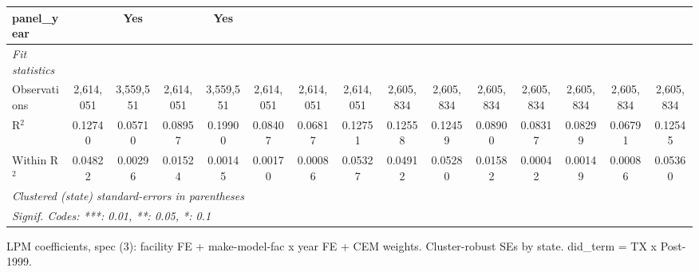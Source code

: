 \begin{tabular}{lcccccccccccccc}
   panel\_year                     &               & Yes                          &                            & Yes             &                  &                    &                        &               &                              &                            &                 &                  &                    & \\  
   \midrule
   \emph{Fit statistics}\\
   Observations                    & 2,614,051     & 3,559,551                    & 2,614,051                  & 3,559,551       & 2,614,051        & 2,614,051          & 2,614,051              & 2,605,834     & 2,605,834                    & 2,605,834                  & 2,605,834       & 2,605,834        & 2,605,834          & 2,605,834\\  
   R$^2$                           & 0.12740       & 0.05710                      & 0.08957                    & 0.19900         & 0.08407          & 0.06817            & 0.12751                & 0.12558       & 0.12459                      & 0.08900                    & 0.08317         & 0.08299          & 0.06791            & 0.12545\\  
   Within R$^2$                    & 0.04822       & 0.00296                      & 0.01524                    & 0.00145         & 0.00170          & 0.00086            & 0.05327                & 0.04912       & 0.05280                      & 0.01582                    & 0.00042         & 0.00149          & 0.00086            & 0.05360\\  
   \midrule \midrule
   \multicolumn{15}{l}{\emph{Clustered (state) standard-errors in parentheses}}\\
   \multicolumn{15}{l}{\emph{Signif. Codes: ***: 0.01, **: 0.05, *: 0.1}}\\
\end{tabular}
 
\par \raggedright 
LPM coefficients, spec (3): facility FE + make-model-fac x year FE + CEM weights. Cluster-robust SEs by state. did\_term = TX x Post-1999.
\par\endgroup


